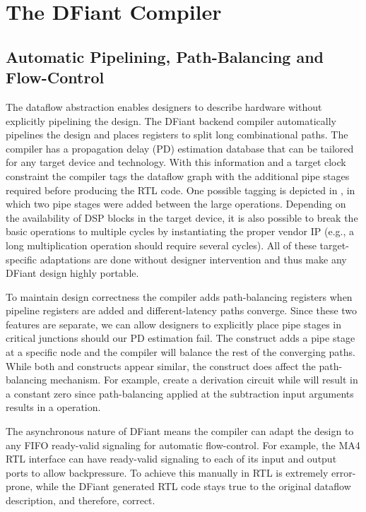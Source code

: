 \section{The DFiant Compiler}

\subsection{Automatic Pipelining, Path-Balancing and Flow-Control}

The dataflow abstraction enables designers to describe hardware without explicitly pipelining the design. The DFiant backend compiler automatically pipelines the design and places registers to split long combinational paths. The compiler has a propagation delay (PD) estimation database that can be tailored for any target device and technology. With this information and a target clock constraint the compiler tags the dataflow graph with the additional pipe stages required before producing the RTL code. One possible tagging is depicted in , in which two pipe stages were added between the large operations. Depending on the availability of DSP blocks in the target device, it is also possible to break the basic operations to multiple cycles by instantiating the proper vendor IP (e.g., a long multiplication operation should require several cycles). All of these target-specific adaptations are done without designer intervention and thus make any DFiant design highly portable.

To maintain design correctness the compiler adds path-balancing registers when pipeline registers are added and different-latency paths converge. Since these two features are separate, we can allow designers to explicitly place pipe stages in critical junctions should our PD estimation fail. The  construct adds a pipe stage at a specific node and the compiler will balance the rest of the converging paths. While both  and  constructs appear similar, the  construct does affect the path-balancing mechanism. For example,  create a derivation circuit while  will result in a constant zero since path-balancing applied at the subtraction input arguments results in a  operation.

The asynchronous nature of DFiant means the compiler can adapt the design to any FIFO ready-valid signaling for automatic flow-control. For example, the MA4 RTL interface can have ready-valid signaling to each of its input and output ports to allow backpressure. To achieve this manually in RTL is extremely error-prone, while the DFiant generated RTL code stays true to the original dataflow description, and therefore, correct.

